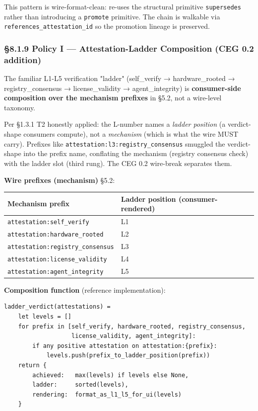 \documentclass[11pt]{article}
\begin{document}
This pattern is wire-format-clean: re-uses the structural primitive \texttt{supersedes} rather than introducing a \texttt{promote} primitive. The chain is walkable via \texttt{references\_attestation\_id} so the promotion lineage is preserved.


\subsubsection*{§8.1.9 Policy I — Attestation-Ladder Composition (CEG 0.2 addition)}


The familiar L1-L5 verification "ladder" (self\_verify → hardware\_rooted → registry\_consensus → license\_validity → agent\_integrity) is \textbf{consumer-side composition over the mechanism prefixes} in §5.2, not a wire-level taxonomy.


Per §1.3.1 T2 honestly applied: the L-number names a \textit{ladder position} (a verdict-shape consumers compute), not a \textit{mechanism} (which is what the wire MUST carry). Prefixes like \texttt{attestation:l3:registry\_consensus} smuggled the verdict-shape into the prefix name, conflating the mechanism (registry consensus check) with the ladder slot (third rung). The CEG 0.2 wire-break separates them.


\textbf{Wire prefixes (mechanism)} §5.2:


{\footnotesize
\begin{longtable}{|p{8.0cm}|p{8.0cm}|}\hline
\textbf{Mechanism prefix} & \textbf{Ladder position (consumer-rendered)} \\ \hline\endhead
\texttt{attestation:self\_verify} & L1 \\ \hline
\texttt{attestation:hardware\_rooted} & L2 \\ \hline
\texttt{attestation:registry\_consensus} & L3 \\ \hline
\texttt{attestation:license\_validity} & L4 \\ \hline
\texttt{attestation:agent\_integrity} & L5 \\ \hline
\end{longtable}}


\textbf{Composition function} (reference implementation):


\begin{lstlisting}
ladder_verdict(attestations) =
    let levels = []
    for prefix in [self_verify, hardware_rooted, registry_consensus,
                   license_validity, agent_integrity]:
        if any positive attestation on attestation:{prefix}:
            levels.push(prefix_to_ladder_position(prefix))
    return {
        achieved:   max(levels) if levels else None,
        ladder:     sorted(levels),
        rendering:  format_as_l1_l5_for_ui(levels)
    }
\end{lstlisting}
\end{document}
